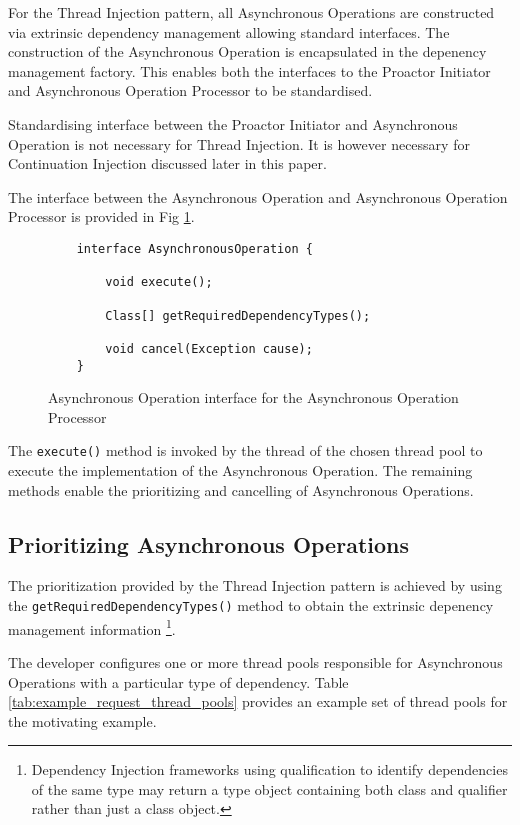 \documentclass{article}
\begin{document}
For the Thread Injection pattern, all Asynchronous Operations are constructed
via extrinsic dependency management \cite{ioc} allowing standard interfaces.
The construction of the Asynchronous Operation is encapsulated in the depenency
management factory.  This enables both the interfaces to the Proactor Initiator
and Asynchronous Operation Processor to be standardised.

Standardising interface between the Proactor Initiator and Asynchronous
Operation is not necessary for Thread Injection.  It is however necessary for
Continuation Injection discussed later in this paper.

The interface between the Asynchronous Operation and Asynchronous Operation
Processor is provided in Fig \ref{fig:AO_interface_AOP}.

\begin{figure}[!t]
\begin{verbatim}
    interface AsynchronousOperation {
    
        void execute();
        
        Class[] getRequiredDependencyTypes();
        
        void cancel(Exception cause);
    }
\end{verbatim}
\caption[Caption for Code]{Asynchronous Operation interface for the Asynchronous Operation Processor}
\label{fig:AO_interface_AOP}
\end{figure}

The \texttt{execute()} method is invoked by the thread of the chosen thread pool
to execute the implementation of the Asynchronous Operation.  The remaining
methods enable the prioritizing and cancelling of Asynchronous Operations.

\subsection{Prioritizing Asynchronous Operations}

The prioritization provided by the Thread Injection pattern is achieved by using
the \texttt{getRequiredDependencyTypes()} method to obtain the extrinsic
depenency management information \footnote{Dependency Injection frameworks using qualification to identify dependencies of the same type may return a type object containing both class and qualifier rather than just a class object.}.

The developer configures one or more thread pools responsible for Asynchronous
Operations with a particular type of dependency. Table
\ref{tab:example_request_thread_pools} provides an example set of thread pools
for the motivating example.
\end{document}
